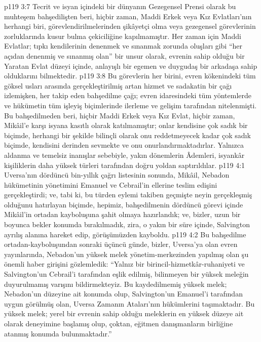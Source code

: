 \vs p119 3:7 Tecrit ve isyan içindeki bir dünyanın Gezegensel Prensi olarak bu muhteşem bahşedilişten beri, hiçbir zaman, Maddi Erkek veya Kız Evlatları’nın herhangi biri, görevlendirilmelerinden şikâyetçi olma veya gezegensel görevlerinin zorluklarında kusur bulma çekiciliğine kapılmamıştır. Her zaman için Maddi Evlatlar; tıpkı kendilerinin denenmek ve sınanmak zorunda oluşları gibi “her açıdan denenmiş ve sınanmış olan” bir unsur olarak, evrenin sahip olduğu bir Yaratan Evlat düzeyi içinde, anlayışlı bir egemen ve duygudaş bir arkadaşa sahip olduklarını bilmektedir.
\vs p119 3:8 Bu görevlerin her birini, evren kökenindeki tüm göksel usları arasında gerçekleştirilmiş artan hizmet ve sadakatin bir çağı izlemişken, her takip eden bahşedilme çağı; evren idaresindeki tüm yöntemlerde ve hükümetin tüm işleyiş biçimlerinde ilerleme ve gelişim tarafından nitelenmişti. Bu bahşedilmeden beri, hiçbir Maddi Erkek veya Kız Evlat, hiçbir zaman, Mikâil’e karşı isyana kasıtlı olarak katılmamıştır; onlar kendisine çok sadık bir biçimde, herhangi bir şekilde bilinçli olarak onu reddetmeyecek kadar çok sadık biçimde, kendisini derinden sevmekte ve onu onurlandırmaktadırlar. Yalnızca aldanma ve temelsiz inanışlar sebebiyle, yakın dönemlerin Âdemleri, isyankâr kişiliklerin daha yüksek türleri tarafından doğru yoldan saptırıldılar.
\vs p119 4:1 Uversa’nın dördüncü bin\hyp{}yıllık çağrı listesinin sonunda, Mikâil, Nebadon hükümetinin yönetimini Emanuel ve Cebrail’in ellerine teslim edişini gerçekleştirdi; ve, tabi ki, bu türden eylemi takiben geçmişte neyin gerçekleşmiş olduğunu hatırlayan biçimde, hepimiz, bahşedilmenin dördüncü görevi içinde Mikâil’in ortadan kayboluşuna şahit olmaya hazırlandık; ve, bizler, uzun bir boyunca bekler konumda bırakılmadık, zira, o yakın bir süre içinde, Salvington ayrılış alanına hareket edip, görüşümüzden kayboldu.
\vs p119 4:2 Bu bahşedilme ortadan\hyp{}kayboluşundan sonraki üçüncü günde, bizler, Uversa’ya olan evren yayınlarında, Nebadon’un yüksek melek yönetim\hyp{}merkezinden yapılmış olan şu önemli haber girişini gözlemledik: “Yalnız bir birincil\hyp{}hizmetkâr\hyp{}ruhaniyeti ve Salvington’un Cebrail’i tarafından eşlik edilmiş, bilinmeyen bir yüksek meleğin duyurulmamış varışını bildirmekteyiz. Bu kaydedilmemiş yüksek melek; Nebadon’un düzeyine ait konumda olup, Salvington’un Emanuel’i tarafından uygun görülmüş olan, Uversa Zamanın Ataları’nın hükümlerini taşımaktadır. Bu yüksek melek; yerel bir evrenin sahip olduğu meleklerin en yüksek düzeye ait olarak deneyimine başlamış olup, çoktan, eğitmen danışmanların birliğine atanmış konumda bulunmaktadır.”
